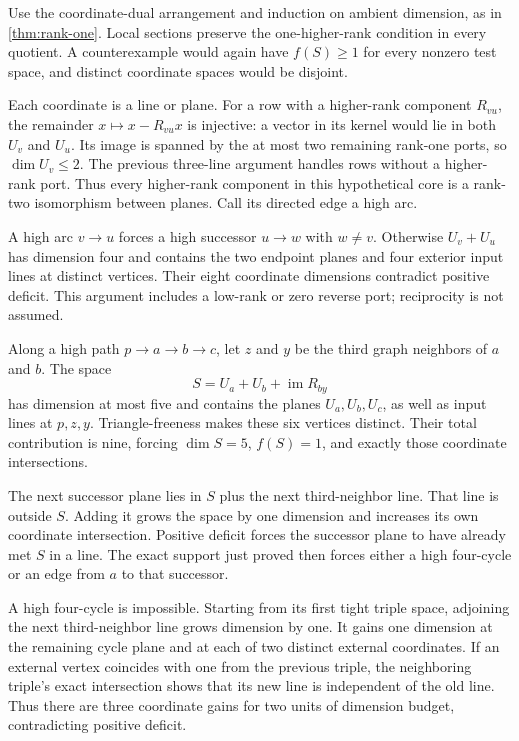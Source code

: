 \begin{outline}
Use the coordinate-dual arrangement and induction on ambient dimension,
as in \cref{thm:rank-one}. Local sections preserve the one-higher-rank
condition in every quotient. A counterexample would again have
$f(S)\geq1$ for every nonzero test space, and distinct coordinate spaces
would be disjoint.

Each coordinate is a line or plane. For a row with a higher-rank component
$R_{vu}$, the remainder $x\mapsto x-R_{vu}x$ is injective: a vector in its
kernel would lie in both $U_v$ and $U_u$. Its image is spanned by the at
most two remaining rank-one ports, so $\dim U_v\leq2$. The previous
three-line argument handles rows without a higher-rank port. Thus every
higher-rank component in this hypothetical core is a rank-two
isomorphism between planes. Call its directed edge a high arc.

A high arc $v\to u$ forces a high successor $u\to w$ with $w\ne v$.
Otherwise $U_v+U_u$ has dimension four and contains the two endpoint
planes and four exterior input lines at distinct vertices. Their eight
coordinate dimensions contradict positive deficit. This argument
includes a low-rank or zero reverse port; reciprocity is not assumed.

Along a high path $p\to a\to b\to c$, let $z$ and $y$ be the third
graph neighbors of $a$ and $b$. The space
\[
 S=U_a+U_b+\operatorname{im}R_{by}
\]
has dimension at most five and contains the planes $U_a,U_b,U_c$,
as well as input lines at $p,z,y$. Triangle-freeness makes these six
vertices distinct. Their total contribution is nine, forcing $\dim S=5$,
$f(S)=1$, and exactly those coordinate intersections.

The next successor plane lies in $S$ plus the next third-neighbor line.
That line is outside $S$. Adding it grows the space by one dimension
and increases its own coordinate intersection. Positive deficit forces
the successor plane to have already met $S$ in a line. The exact support
just proved then forces either a high four-cycle or an edge from $a$
to that successor.

A high four-cycle is impossible. Starting from its first tight triple
space, adjoining the next third-neighbor line grows dimension by one.
It gains one dimension at the remaining cycle plane and at each of two
distinct external coordinates. If an external vertex coincides with
one from the previous triple, the neighboring triple's exact intersection
shows that its new line is independent of the old line. Thus there are
three coordinate gains for two units of dimension budget, contradicting
positive deficit.


\end{outline}
